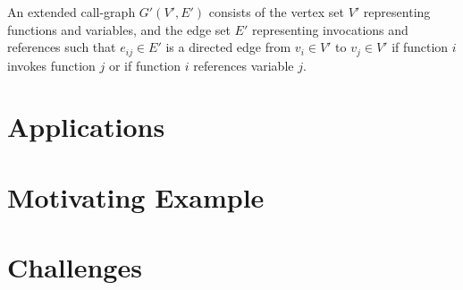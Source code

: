 \begin{definition}
    An extended call-graph $G'(V',E')$ consists of the vertex set $V'$ representing functions and variables, and the edge set $E'$ representing invocations and references such that $e_{ij}\in{E'}$ is a directed edge from $v_i\in{V'}$ to $v_j\in{V'}$ if function $i$ invokes function $j$ or if function $i$ references variable $j$.
\end{definition}

\section{Applications}

\section{Motivating Example}

\section{Challenges}


